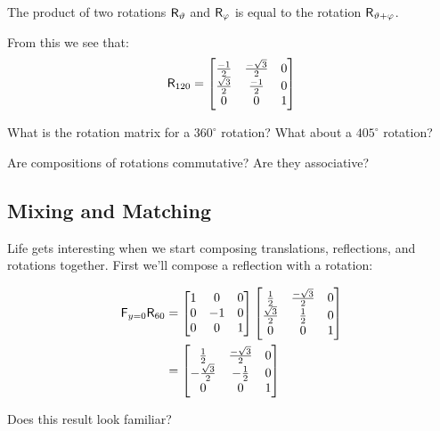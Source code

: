 \begin{theorem}
The product of two rotations $\mathsf{R}_\vartheta$ and $\mathsf{R}_\varphi$ is
equal to the rotation $\mathsf{R}_{\vartheta+\varphi}$.
\end{theorem}

From this we see that:
\[
\mathsf{R}_{120} =
\begin{bmatrix}
\frac{-1}{2} & \frac{-\sqrt{3}}{2} & 0\\
\frac{\sqrt{3}}{2} & \frac{-1}{2} & 0\\
0 & 0 & 1
\end{bmatrix}
\]

\begin{question} What is the rotation matrix for a $360^\circ$ rotation? What about a $405^\circ$ rotation?
\end{question}
\QM

\begin{question}
Are compositions of rotations commutative?  Are they
associative?
\end{question}
\QM



\subsection{Mixing and Matching}

Life gets interesting when we start composing translations,
reflections, and rotations together.  First we'll compose a reflection
with a rotation:

\begin{align*}
\mathsf{F}_{y=0}\mathsf{R}_{60} &= \begin{bmatrix}
1 &  0 & 0\\
0 & -1 & 0\\
0 &  0 & 1
\end{bmatrix}
\begin{bmatrix}
\frac{1}{2} & \frac{-\sqrt{3}}{2} & 0\\ \frac{\sqrt{3}}{2} &
\frac{1}{2} & 0\\ 0 & 0 & 1
\end{bmatrix}\\
&= \begin{bmatrix}
\frac{1}{2} & \frac{-\sqrt{3}}{2} & 0\\
-\frac{\sqrt{3}}{2} & -\frac{1}{2} & 0\\
0 & 0 & 1
\end{bmatrix}
\end{align*}

\begin{question}
Does this result look familiar?
\end{question}
\QM

